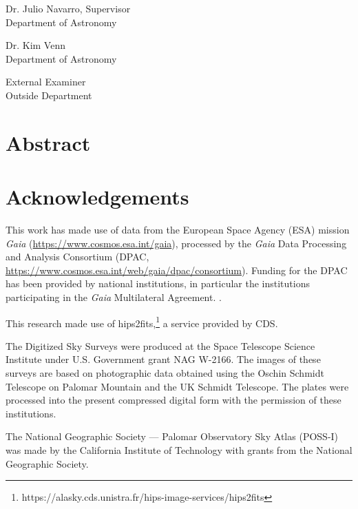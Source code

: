 \documentclass[12pt,oneside,letterpaper]{report}
\newcommand{\skipline}{\vspace{\baselineskip}}
\begin{document}
Dr. Julio Navarro, Supervisor\\
Department of Astronomy \\
\skipline

\noindent Dr. Kim Venn\\
Department of Astronomy\\

\skipline

\noindent External Examiner \\
Outside Department

\chapter*{Abstract}


\chapter*{Acknowledgements}




This work has made use of data from the European Space Agency (ESA) mission
{\it Gaia} (\url{https://www.cosmos.esa.int/gaia}), processed by the {\it Gaia}
Data Processing and Analysis Consortium (DPAC,
\url{https://www.cosmos.esa.int/web/gaia/dpac/consortium}). Funding for the DPAC
has been provided by national institutions, in particular the institutions
participating in the {\it Gaia} Multilateral Agreement. 
\citep{gaiacollaboration+2016, gaiacollaboration+2023}.


This research made use of hips2fits,\footnote{https://alasky.cds.unistra.fr/hips-image-services/hips2fits} a service provided by CDS.


The Digitized Sky Surveys were produced at the Space Telescope Science Institute under U.S. Government grant NAG W-2166. The images of these surveys are based on photographic data obtained using the Oschin Schmidt Telescope on Palomar Mountain and the UK Schmidt Telescope. The plates were processed into the present compressed digital form with the permission of these institutions.

The National Geographic Society --- Palomar Observatory Sky Atlas (POSS-I) was made by the California Institute of Technology with grants from the National Geographic Society.
\end{document}

